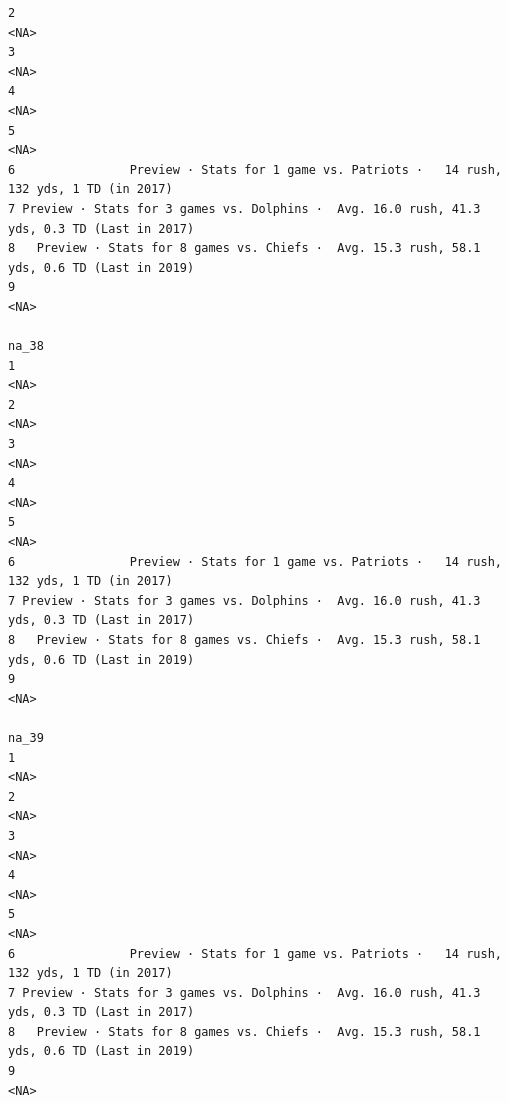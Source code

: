 \documentclass[
]{article}
\begin{document}
\begin{verbatim}
2                                                                                        <NA>
3                                                                                        <NA>
4                                                                                        <NA>
5                                                                                        <NA>
6                Preview · Stats for 1 game vs. Patriots ·   14 rush, 132 yds, 1 TD (in 2017)
7 Preview · Stats for 3 games vs. Dolphins ·  Avg. 16.0 rush, 41.3 yds, 0.3 TD (Last in 2017)
8   Preview · Stats for 8 games vs. Chiefs ·  Avg. 15.3 rush, 58.1 yds, 0.6 TD (Last in 2019)
9                                                                                        <NA>
                                                                                        na_38
1                                                                                        <NA>
2                                                                                        <NA>
3                                                                                        <NA>
4                                                                                        <NA>
5                                                                                        <NA>
6                Preview · Stats for 1 game vs. Patriots ·   14 rush, 132 yds, 1 TD (in 2017)
7 Preview · Stats for 3 games vs. Dolphins ·  Avg. 16.0 rush, 41.3 yds, 0.3 TD (Last in 2017)
8   Preview · Stats for 8 games vs. Chiefs ·  Avg. 15.3 rush, 58.1 yds, 0.6 TD (Last in 2019)
9                                                                                        <NA>
                                                                                        na_39
1                                                                                        <NA>
2                                                                                        <NA>
3                                                                                        <NA>
4                                                                                        <NA>
5                                                                                        <NA>
6                Preview · Stats for 1 game vs. Patriots ·   14 rush, 132 yds, 1 TD (in 2017)
7 Preview · Stats for 3 games vs. Dolphins ·  Avg. 16.0 rush, 41.3 yds, 0.3 TD (Last in 2017)
8   Preview · Stats for 8 games vs. Chiefs ·  Avg. 15.3 rush, 58.1 yds, 0.6 TD (Last in 2019)
9                                                                                        <NA>

\end{verbatim}
\end{document}
